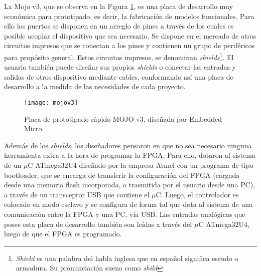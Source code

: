 La Mojo v3, que se observa en la Figura \ref{mojo}, es una placa de desarrollo muy económica para prototipado, es decir, la fabricación de modelos funcionales. Para ello los puertos se disponen en un arreglo de pines a través de los cuales es posible acoplar el dispositivo que sea necesario. Se dispone en el mercado de otros circuitos impresos que se conectan a los pines y contienen un grupo de periféricos para propósito general. Estos circuitos impresos, se denominan \textit{shields}\footnote{ \textit{Shield} es una palabra del habla inglesa que en español significa escudo o armadura. Su pronunciación suena como \textit{shild}}. El usuario también puede diseñar sus propios \textit{shields} o conectar las entradas y salidas de otros dispositivo mediante cables, conformando así una placa de desarrollo a la medida de las necesidades de cada proyecto.%

\begin{figure}[b]
	\centering
	\texttt{[image: mojov3]}
	\caption{Placa de prototipado rápido MOJO v3, diseñada por Embedded Micro}
	\label{mojo}
\end{figure}

Además de los \textit{shields}, los diseñadores pensaron en que no sea necesario ninguna herramienta extra a la hora de programar la FPGA. Para ello, dotaron al sistema de un $\mu$C ATmega32U4 diseñado por la empresa Atmel con un programa de tipo bootloader, que se encarga de transferir la configuración del FPGA (cargada desde una memoria flash incorporada, o trasmitida por el usuario desde una PC), a través de un transceptor USB que contiene el $\mu$C. Luego, el controlador es colocado en modo esclavo y se configura de forma tal que dota al sistema de una comunicación entre la FPGA y una PC, vía USB. Las entradas analógicas que posee esta placa de desarrollo también son leídas a través del $\mu$C ATmega32U4, luego de que el FPGA es programado.%

